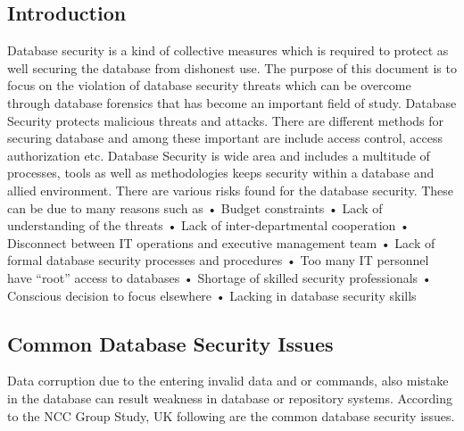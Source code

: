 \documentclass[12pt]{book} %
\begin{document}
\subsection*{Introduction}
Database security is a kind of collective measures which is required to protect as well securing the database from dishonest use. The purpose of this document is to focus on the violation of database security threats which can be overcome through database forensics that has become an important field of study. Database Security protects malicious threats and attacks. There are different
methods for securing database and among these important are include access control, access authorization etc. Database Security is wide area and includes a multitude of processes, tools as well as
methodologies keeps security within a database and allied environment. There are various risks found for the database security. These can be due to many reasons such as
• Budget constraints
• Lack of understanding of the threats
• Lack of inter-departmental cooperation
• Disconnect between IT operations and executive management team
• Lack of formal database security processes and procedures
• Too many IT personnel have “root” access to databases
• Shortage of skilled security professionals
• Conscious decision to focus elsewhere
• Lacking in database security skills




\subsection*{Common Database Security Issues}


Data corruption due to the entering invalid data and or commands, also mistake in the database can result weakness in database or repository systems. According to the NCC Group Study, UK following are the common
database security issues.\cite{db_security_an_overview_and_analysis_of_current_trend} \label{sec:db_security_an_overview_and_analysis_of_current_trend_1}\\
\end{document}
